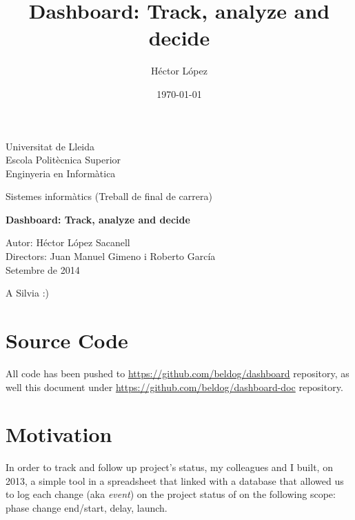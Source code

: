 \documentclass[a4paper,12pt,english]{book}
\newenvironment{dedication}
{
   \cleardoublepage
   \thispagestyle{empty}
   \vspace*{\stretch{1}}
   \hfill\begin{minipage}[t]{0.15\textwidth}
   \raggedright
}%
{
   \end{minipage}
   \vspace*{\stretch{3}}
   \clearpage
}
\begin{document}
\clearpage\thispagestyle{empty}

\begin{framed}
	\begin{center}
	Universitat de Lleida \\ \medskip
	Escola Politècnica Superior \\ \medskip
	Enginyeria en Informàtica \\ \bigskip \bigskip
	
	Sistemes informàtics (Treball de final de carrera) \\ \bigskip \bigskip 
	
	\textbf{Dashboard: Track, analyze and decide}
	\end{center}

	\bigskip
	
	\raggedleft
	Autor: Héctor López Sacanell\\
	Directors: Juan Manuel Gimeno i Roberto García\\
	Setembre de 2014
	\bigskip
\end{framed}

\title{Dashboard: Track, analyze and decide}
\author{Héctor López}

\date{\today}

\begin{dedication}
A Silvia :)
\end{dedication}

%

\tableofcontents


\chapter*{Source Code}
All code has been pushed to \url{https://github.com/beldog/dashboard}
repository, as well this document under \url{https://github.com/beldog/dashboard-doc} repository.

\chapter*{Motivation}
In order to track and follow up project's status, my colleagues and I
built, on 2013, a simple tool in a spreadsheet that linked with a database that
allowed us to log each change (aka \emph{event}) on the project status of on
the following scope: phase change end/start, delay, launch.
\end{document}
